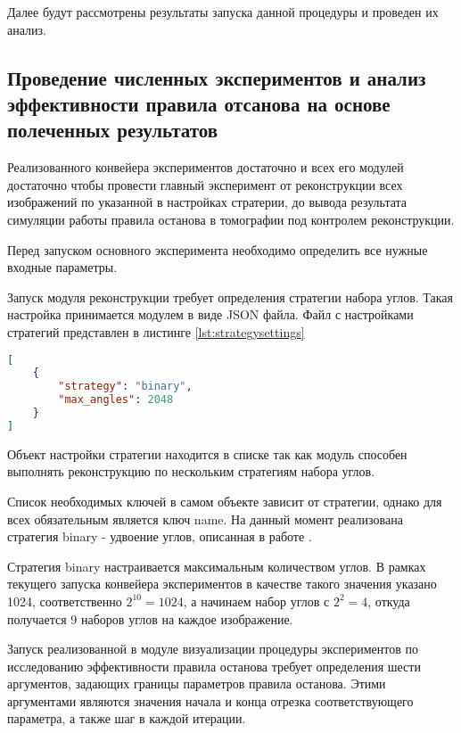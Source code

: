 Далее будут рассмотрены результаты запуска данной процедуры и проведен их анализ.

\subsection{Проведение численных экспериментов и анализ эффективности правила отсанова на основе полеченных результатов}

Реализованного конвейера экспериментов достаточно и всех его модулей достаточно чтобы провести главный эксперимент от реконструкции всех изображений по указанной в настройках стратерии, до вывода результата симуляции работы правила останова в томографии под контролем реконструкции.

Перед запуском основного эксперимента необходимо определить все нужные входные параметры.

Запуск модуля реконструкции требует определения стратегии набора углов. Такая настройка принимается модулем в виде JSON файла. Файл с настройками стратегий представлен в листинге \ref*{lst:strategysettings}

\begin{lstlisting}[language=json, caption={Файл конфигурации стратегий набора углов для конвейера экспериментов}, label={lst:strategysettings}]
[
    {
        "strategy": "binary",
        "max_angles": 2048
    }
]
\end{lstlisting}

Объект настройки стратегии находится в списке так как модуль способен выполнять реконструкцию по нескольким стратегиям набора углов.

Список необходимых ключей в самом объекте зависит от стратегии, однако для всех обязательным является ключ name. На данный момент реализована стратегия binary - удвоение углов, описанная в работе \cite{gilmanov2024applicability}.

Стратегия binary настраивается максимальным количеством углов. В рамках текущего запуска конвейера экспериментов в качестве такого значения указано 1024, соответственно \(2^{10} = 1024\), а начинаем набор углов с \(2^2 = 4\), откуда получается 9 наборов углов на каждое изображение.

Запуск реализованной в модуле визуализации процедуры экспериментов по исследованию эффективности правила останова требует определения шести аргументов, задающих границы параметров правила останова. Этими аргументами являются значения начала и конца отрезка соответствующего параметра, а также шаг в каждой итерации.

